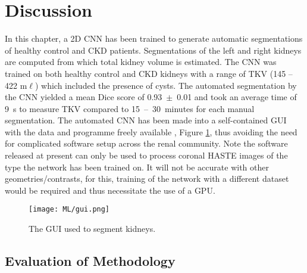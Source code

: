 \newpage

\section{Discussion}
In this chapter, a 2D \ac{CNN} has been trained to generate automatic segmentations of healthy control and \ac{CKD} patients. Segmentations of the left and right kidneys are computed from which total kidney volume is estimated. The \ac{CNN} was trained on both healthy control and \ac{CKD} kidneys with a range of \ac{TKV} (145 – 422 m$\ell$) which included the presence of cysts. The automated segmentation by the \ac{CNN} yielded a mean Dice score of 0.93~$\pm$~0.01 and took an average time of 9~s to measure \ac{TKV} compared to 15~–~30~minutes \cite{zollner_assessment_2012} for each manual segmentation. The automated \ac{CNN} has been made into a self-contained \ac{GUI} with the data and programme freely available \cite{daniel_alexdaniel654renal_segmentor_2020}, Figure \ref{fig:ml_gui}, thus avoiding the need for complicated software setup across the renal community. Note the software released at present can only be used to process coronal \ac{HASTE} images of the type the network has been trained on. It will not be accurate with other geometries/contrasts, for this, training of the network with a different dataset would be required and thus necessitate the use of a \ac{GPU}.

\begin{figure}[H]
	\centering
	\texttt{[image: ML/gui.png]}
	\caption{The \acf{GUI} used to segment kidneys.}
	\label{fig:ml_gui}	
\end{figure}

\newpage
\subsection{Evaluation of Methodology}

